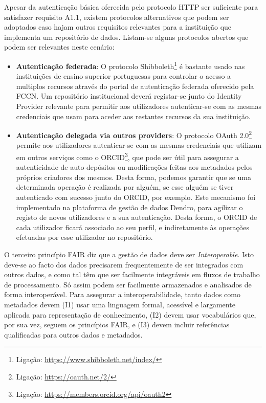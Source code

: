\documentclass[sigconf,nonacm]{acmart}
\begin{document}
Apesar da autenticação básica oferecida pelo protocolo \gls{HTTP} ser suficiente para satisfazer requisito A1.1, existem protocolos alternativos que podem ser adoptados caso hajam outros requisitos relevantes para a instituição que implementa um repositório de dados. Listam-se alguns protocolos abertos que podem ser relevantes neste cenário:

\begin{itemize}
  \item \textbf{Autenticação federada}: O protocolo Shibboleth\footnote{Ligação: \url{https://www.shibboleth.net/index/}} é bastante usado nas instituições de ensino superior portuguesas para controlar o acesso a multiplos recursos através do portal de autenticação federada oferecido pela \gls{FCCN}. Um repositório institucional deverá registar-se junto do Identity Provider relevante para permitir aos utilizadores autenticar-se com as mesmas credenciais que usam para aceder aos restantes recursos da sua instituição.
  \item \textbf{Autenticação delegada via outros providers}: O protocolo OAuth 2.0\footnote{Ligação: \url{https://oauth.net/2/}} permite aos utilizadores autenticar-se com as mesmas credenciais que utilizam em outros serviços como o \gls{ORCID}\footnote{Ligação: \url{https://members.orcid.org/api/oauth2}}, que pode ser útil para assegurar a autenticidade de auto-depósitos ou modificações feitas aos metadados pelos próprios criadores dos mesmos. Desta forma, podemos garantir que se uma determinada operação é realizada por alguém, se esse alguém se tiver autenticado com sucesso junto do \gls{ORCID}, por exemplo. Este mecanismo foi implementado na plataforma de gestão de dados Dendro, para agilizar o registo de novos utilizadores e a sua autenticação. Desta forma, o \gls{ORCID} de cada utilizador ficará associado ao seu perfil, e indiretamente às operações efetuadas por esse utilizador no repositório.
\end{itemize}


O terceiro princípio \gls{FAIR} diz que a gestão de dados deve ser \emph{Interoperable}. Isto deve-se ao facto dos dados precisarem frequentemente de ser integrados com outros dados, e como tal têm que ser facilmente integráveis em fluxos de trabalho de processamento. Só assim podem ser facilmente armazenados e analisados de forma interoperável. Para assegurar a interoperabilidade, tanto dados como metadados devem (I1) usar uma linguagem formal, acessível e largamente aplicada para representação de conhecimento, (I2) devem usar vocabulários que, por sua vez, seguem os princípios \gls{FAIR}, e (I3) devem incluir referências qualificadas para outros dados e metadados.
\end{document}
